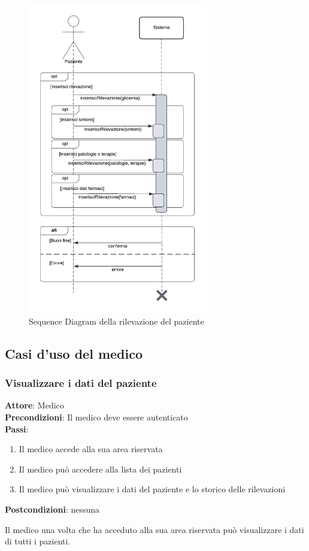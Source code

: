 \documentclass[a4paper]{article}
\begin{document}
\begin{figure}[H]
	\centering
	\includegraphics[width=0.7\textwidth]{sdPaziente}
	\caption{Sequence Diagram della rilevazione del paziente}
	\label{fig:sdPaziente}
\end{figure}

\subsection{Casi d'uso del medico}

\subsubsection{Visualizzare i dati del paziente}

\begin{mdframed}
	\textbf{Attore}: Medico\\
	\textbf{Precondizioni}: Il medico deve essere autenticato\\
	\textbf{Passi}: 
	\begin{enumerate}[nosep]
	  \item Il medico accede alla sua area riservata
	  \item Il medico può accedere alla lista dei pazienti
	  \item Il medico può visualizzare i dati del paziente e lo storico delle rilevazioni
	\end{enumerate}
	\textbf{Postcondizioni}: nessuna
  \end{mdframed}
\noindent
Il medico una volta che ha acceduto alla sua area riservata può visualizzare i dati di tutti i pazienti. 
\end{document}
